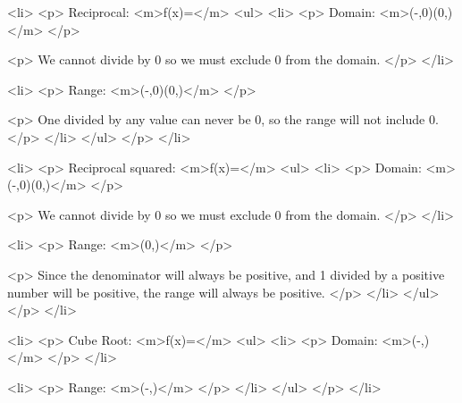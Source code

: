             <li>
                <p>
                    Reciprocal: <m>f(x)=</m>
                    <ul>
                        <li>
                            <p>
                                Domain: <m>(-\infty,0)\cup(0,\infty)</m>
                            </p>

                            <p>
                                We cannot divide by 0 so we must exclude 0 from the domain.
                            </p>
                        </li>

                        <li>
                            <p>
                                Range: <m>(-\infty,0)\cup(0,\infty)</m>
                            </p>

                            <p>
                                One divided by any value can never be 0, so the range will not include 0.
                            </p>
                        </li>
                    </ul>
                </p>
            </li>

            <li>
                <p>
                    Reciprocal squared: <m>f(x)=</m>
                    <ul>
                        <li>
                            <p>
                                Domain: <m>(-\infty,0)\cup(0,\infty)</m>
                            </p>

                            <p>
                                We cannot divide by 0 so we must exclude 0 from the domain.
                            </p>
                        </li>

                        <li>
                            <p>
                                Range: <m>(0,\infty)</m>
                            </p>

                            <p>
                                Since the denominator will always be positive, and 1 divided by a positive number will be positive, the range will always be positive.
                            </p>
                        </li>
                    </ul>
                </p>
            </li>

            <li>
                <p>
                    Cube Root: <m>f(x)=</m>
                    <ul>
                        <li>
                            <p>
                                Domain: <m>(-\infty,\infty)</m>
                            </p>
                        </li>

                        <li>
                            <p>
                                Range: <m>(-\infty,\infty)</m>
                            </p>
                        </li>
                    </ul>
                </p>
            </li>


